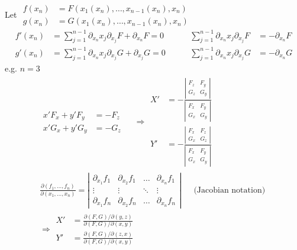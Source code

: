 \documentclass[twoside]{amsart}
\theoremstyle{plain}
\theoremstyle{definition}
\begin{document}
Let $\begin{aligned} f(x_n) & = F(x_1(x_n), \dots, x_{n-1}(x_n), x_n ) \\ g(x_n) & = G(x_1(x_n), \dots, x_{n-1}(x_n), x_n) \end{aligned}$ 
\[
\begin{aligned}
  f'(x_n) & = \sum_{j=1}^{n-1} \partial_{x_n} x_j \partial_{x_j} F + \partial_{x_n} F = 0 \\
  g'(x_n) & = \sum_{j=1}^{n-1} \partial_{x_n} x_j \partial_{x_j} G + \partial_{x_j} G = 0 
\end{aligned} \quad \quad \, 
\begin{aligned}
  \sum_{j=1}^{n-1} \partial_{x_n} x_j \partial_{x_j} F & = - \partial_{x_n} F \\ 
  \sum_{j=1}^{n-1} \partial_{x_n} x_j \partial_{x_j} G & = - \partial_{x_n} G 
\end{aligned}
\]
e.g. $n=3$
\[
\begin{gathered}
\begin{aligned}
  x' F_x + y' F_y & = -F_z \\
  x' G_x + y' G_y & = -G_z 
\end{aligned} \quad \, \Longrightarrow 
\begin{aligned}
  X' & = - \frac{ \left| \begin{matrix} F_z & F_y \\ G_z & G_y \end{matrix} \right| }{ \left| \begin{matrix} F_x & F_y \\ G_x & G_y \end{matrix} \right| } \\
  Y' & = - \frac{ \left| \begin{matrix} F_x & F_z \\ G_x & G_z \end{matrix} \right| }{ \left| \begin{matrix} F_x & F_y \\ G_x & G_y \end{matrix} \right| } \end{aligned} \\
\frac{ \partial(f_1, \dots, f_n) }{ \partial(x_1, \dots, x_n) } = \left| \begin{matrix} \partial_{x_1} f_1 & \partial_{x_2} f_1 & \dots & \partial_{x_n} f_1 \\ \vdots & \vdots & \ddots & \vdots \\ \partial_{x_1} f_n & \partial_{x_2} f_n & \dots & \partial_{x_n} f_n \end{matrix} \right| \quad \, \text{ (Jacobian notation) } \\
\Longrightarrow \begin{aligned}
  X' & = \frac{ \partial(F,G)/\partial(y,z) }{ \partial(F,G)/\partial(x,y) } \\
  Y' & = \frac{ \partial(F,G)/\partial(z,x) }{ \partial(F,G)/\partial(x,y) }
\end{aligned}
\end{gathered}
\]
\end{document}
